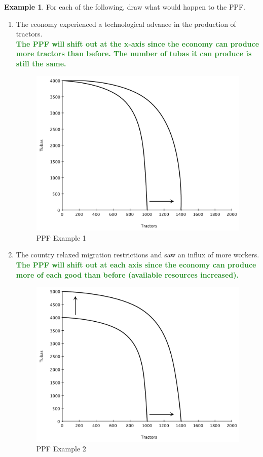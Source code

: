 \documentclass[11pt]{article}\usepackage[]{graphicx}\usepackage[]{color}
\theoremstyle{definition}
\newtheorem{exmp}{Example}[section]
\newcommand{\ddp}[1]{{\textbf{\textcolor{ForestGreen}{#1}}}}
\begin{document}
	\begin{exmp} For each of the following, draw what would happen to the PPF.
		\begin{enumerate}
			\item The economy experienced a technological advance in the production of tractors.
			\ddp{\\ The PPF will shift out at the x-axis since the economy can produce more tractors than before. The number of tubas it can produce is still the same.}
			\begin{figure}[H]
				\centering
				\includegraphics[scale=.40]{plot2.pdf}
				\caption{PPF Example 1}
				\label{ppf2}
			\end{figure}
			\item The country relaxed migration restrictions and saw an influx of more workers.
			\ddp{\\ The PPF will shift out at each axis since the economy can produce more of each good than before (available resources increased).} 
				\begin{figure}[H]
					\centering
					\includegraphics[scale=.40]{plot3.pdf}
					\caption{PPF Example 2}
					\label{ppf3}
				\end{figure}
		\end{enumerate}
	\end{exmp} 
\end{document}
